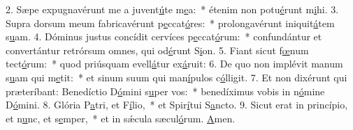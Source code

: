 2. Sæpe expugnavérunt me a juvent\uline{ú}te m\uline{e}a:~* étenim non potu\uline{é}runt m\uline{i}hi.
3. Supra dorsum meum fabricavérunt p\uline{e}ccat\uline{ó}res:~* prolongavérunt iniquit\uline{á}tem s\uline{u}am.
4. Dóminus justus concídit cervíces p\uline{e}ccat\uline{ó}rum:~* confundántur et convertántur retrórsum omnes, qui od\uline{é}runt S\uline{i}on.
5. Fiant sicut f\uline{œ}num tect\uline{ó}rum:~* quod priúsquam evell\uline{á}tur ex\uline{á}ruit:
6. De quo non implévit manum s\uline{u}am qui m\uline{e}tit:~* et sinum suum qui man\uline{í}pulos c\uline{ó}lligit.
7. Et non dixérunt qui præteríbant: Benedíctio D\uline{ó}mini s\uline{u}per vos:~* benedíximus vobis in n\uline{ó}mine D\uline{ó}mini.
8. Glória P\uline{a}tri, et F\uline{í}lio,~* et Spir\uline{í}tui S\uline{a}ncto.
9. Sicut erat in princípio, et n\uline{u}nc, et s\uline{e}mper,~* et in sǽcula sæcul\uline{ó}rum. \uline{A}men.
